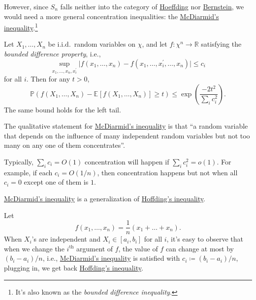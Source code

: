 However, since \(S_n\) falls neither into the category of \hyperref[thm:Hoeffding-inequality]{Hoeffding} nor \hyperref[thm:Bernstein-inequality]{Bernstein}, we would need a more general concentration inequalities: the \hyperref[thm:McDiarmid-inequality]{McDiarmid's inequality}.\footnote{It's also known as the \emph{bounded difference inequality}.}

\begin{theorem}\label{thm:McDiarmid-inequality}
	Let \(X_1, \dots , X_n\) be i.i.d.\ random variables on \(\chi \), and let \(f\colon \chi ^n \to \mathbb{R} \) satisfying the \emph{bounded difference property}, i.e.,
	\[
		\sup _{x_1, \dots , x_n, x_i^{\prime} }\vert f(x_1, \dots , x_n) - f(x_1, \dots , x_i^{\prime} , \dots , x_n) \vert \leq c_i
	\]
	for all \(i\). Then for any \(t > 0\),
	\[
		\mathbb{P} (f(X_1, \dots , X_n) - \mathbb{E}_{}\left[f (X_1, \dots , X_n)\right] \geq t) \leq \exp \left( \frac{-2t^2}{\sum_{i} c_i^2} \right).
	\]
	The same bound holds for the left tail.
\end{theorem}

\begin{remark}
	The qualitative statement for \hyperref[thm:McDiarmid-inequality]{McDiarmid's inequality} is that ``a random variable that depends on the influence of many independent random variables but not too many on any one of them concentrates''.
\end{remark}
\begin{explanation}
	Typically, \(\sum_{i} c_i = O(1)\) concentration will happen if \(\sum_{i} c_i^2 = o(1)\). For example, if each \(c_i = O(1 / n)\), then concentration happens but not when all \(c_i = 0\) except one of them is \(1\).
\end{explanation}

\begin{remark}
	\hyperref[thm:McDiarmid-inequality]{McDiarmid's inequality} is a generalization of \hyperref[thm:Hoeffding-inequality]{Hoffding's inequality}.
\end{remark}
\begin{explanation}
	Let
	\[
		f(x_1, \dots , x_n) = \frac{1}{n}(x_1 + \dots + x_n).
	\]
	When \(X_i\)'s are independent and \(X_i \in [a_i, b_i]\) for all \(i\), it's easy to observe that when we change the \(i^{\text{th} }\) argument of \(f\), the value of \(f\) can change at most by \((b_i - a_i) / n\), i.e., \hyperref[thm:McDiarmid-inequality]{McDiarmid's inequality} is satisfied with \(c_i \coloneqq (b_i - a_i) / n\), plugging in, we get back \hyperref[thm:Hoeffding-inequality]{Hoffding's inequality}.
\end{explanation}

